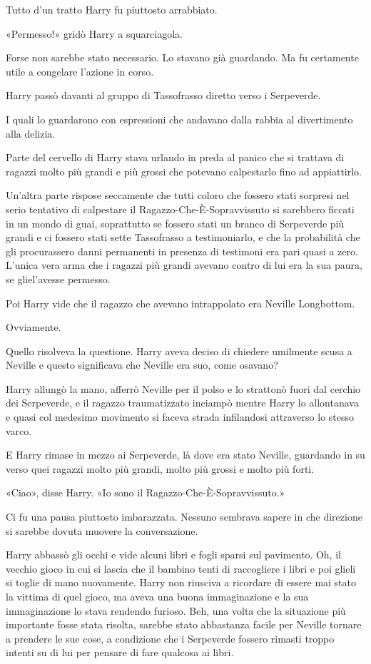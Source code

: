 Tutto d’un tratto Harry fu piuttosto arrabbiato.

«Permesso!» gridò Harry a squarciagola.

Forse non sarebbe stato necessario. Lo stavano già guardando. Ma fu certamente utile a congelare l’azione in corso.

Harry passò davanti al gruppo di Tassofrasso diretto verso i Serpeverde.

I quali lo guardarono con espressioni che andavano dalla rabbia al divertimento alla delizia.

Parte del cervello di Harry stava urlando in preda al panico che si trattava di ragazzi molto più grandi e più grossi che potevano calpestarlo fino ad appiattirlo.

Un’altra parte rispose seccamente che tutti coloro che fossero stati sorpresi nel serio tentativo di calpestare il Ragazzo-Che-È-Sopravvissuto si sarebbero ficcati in un mondo di guai, soprattutto se fossero stati un branco di Serpeverde più grandi e ci fossero stati sette Tassofrasso a testimoniarlo, e che la probabilità che gli procurassero danni permanenti in presenza di testimoni era pari quasi a zero. L’unica vera arma che i ragazzi più grandi avevano contro di lui era la sua paura, se gliel’avesse permesso.

Poi Harry vide che il ragazzo che avevano intrappolato era Neville Longbottom.

Ovviamente.

Quello risolveva la questione. Harry aveva deciso di chiedere umilmente scusa a Neville e questo significava che Neville era suo, come osavano?

Harry allungò la mano, afferrò Neville per il polso e lo strattonò fuori dal cerchio dei Serpeverde, e il ragazzo traumatizzato inciampò mentre Harry lo allontanava e quasi col medesimo movimento si faceva strada infilandosi attraverso lo stesso varco.

E Harry rimase in mezzo ai Serpeverde, là dove era stato Neville, guardando in su verso quei ragazzi molto più grandi, molto più grossi e molto più forti.

«Ciao», disse Harry. «Io sono il Ragazzo-Che-È-Sopravvissuto.»

Ci fu una pausa piuttosto imbarazzata. Nessuno sembrava sapere in che direzione si sarebbe dovuta muovere la conversazione.

Harry abbassò gli occhi e vide alcuni libri e fogli sparsi sul pavimento. Oh, il vecchio gioco in cui si lascia che il bambino tenti di raccogliere i libri e poi glieli si toglie di mano nuovamente. Harry non riusciva a ricordare di essere mai stato la vittima di quel gioco, ma aveva una buona immaginazione e la sua immaginazione lo stava rendendo furioso. Beh, una volta che la situazione più importante fosse stata risolta, sarebbe stato abbastanza facile per Neville tornare a prendere le sue cose, a condizione che i Serpeverde fossero rimasti troppo intenti su di lui per pensare di fare qualcosa ai libri.

